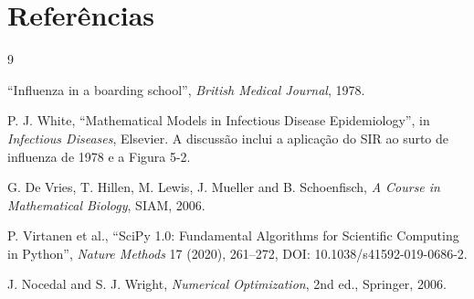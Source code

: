 \documentclass[11pt,a4paper]{article}
\begin{document}
\section{Referências}
\begin{thebibliography}{9}

``Influenza in a boarding school'', \emph{British Medical Journal},
1978.

P. J. White, ``Mathematical Models in Infectious Disease Epidemiology'',
in \emph{Infectious Diseases}, Elsevier. A discussão inclui a aplicação
do SIR ao surto de influenza de 1978 e a Figura 5-2.

G. De Vries, T. Hillen, M. Lewis, J. Mueller and B. Schoenfisch,
\emph{A Course in Mathematical Biology}, SIAM, 2006.

P. Virtanen et al., ``SciPy 1.0: Fundamental Algorithms for Scientific
Computing in Python'', \emph{Nature Methods} 17 (2020), 261--272,
DOI: 10.1038/s41592-019-0686-2.

J. Nocedal and S. J. Wright, \emph{Numerical Optimization}, 2nd ed.,
Springer, 2006.

\end{thebibliography}
\end{document}
